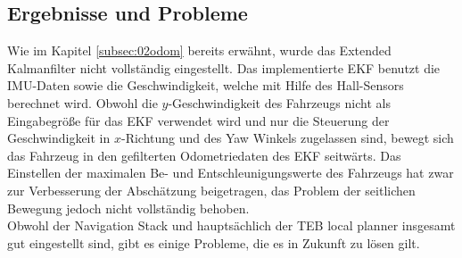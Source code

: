 \subsection{Ergebnisse und Probleme}
\label{subsec:02ergebnisse}
Wie im Kapitel \ref{subsec:02odom} bereits erw\"ahnt, wurde das Extended Kalmanfilter nicht vollst\"andig eingestellt. Das implementierte EKF benutzt die IMU-Daten sowie die Geschwindigkeit, welche mit Hilfe des Hall-Sensors berechnet wird. Obwohl die $y$-Geschwindigkeit des Fahrzeugs nicht als Eingabegr\"o{\ss}e f\"ur das EKF verwendet wird und nur die Steuerung der Geschwindigkeit in $x$-Richtung und des Yaw Winkels zugelassen sind, bewegt sich das Fahrzeug in den gefilterten Odometriedaten des EKF seitw\"arts. Das Einstellen der maximalen Be- und Entschleunigungswerte des Fahrzeugs hat zwar zur Verbesserung der Absch\"atzung beigetragen, das Problem der seitlichen Bewegung jedoch nicht vollst\"andig behoben.\\
Obwohl der Navigation Stack und haupts\"achlich der TEB local planner insgesamt gut eingestellt sind, gibt es einige Probleme, die es in Zukunft zu l\"osen gilt.
